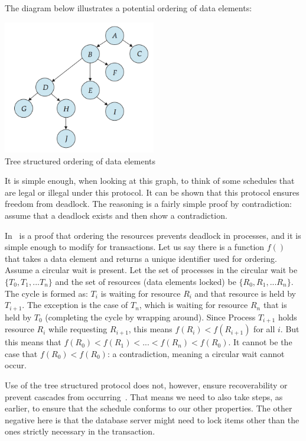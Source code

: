 The diagram below illustrates a potential ordering of data elements:

\begin{center}
\includegraphics[width=0.5\textwidth]{images/tree-lock}\\
Tree structured ordering of data elements~\cite{dsc}
\end{center}

It is simple enough, when looking at this graph, to think of some schedules that are legal or illegal under this protocol. It can be shown that this protocol ensures freedom from deadlock. The reasoning is a fairly simple proof by contradiction: assume that a deadlock exists and then show a contradiction.

In~\cite{osc} is a proof that ordering the resources prevents deadlock in processes, and it is simple enough to modify for transactions. Let us say there is a function $f()$ that takes a data element and returns a unique identifier used for ordering. Assume a circular wait is present. Let the set of processes in the circular wait be $\{T_{0}, T_{1}, ... T_{n}\}$ and the set of resources (data elements locked) be $\{R_{0}, R_{1}, ... R_{n}\}$. The cycle is formed as: $T_{i}$ is waiting for resource $R_{i}$ and that resource is held by $T_{i+1}$. The exception is the case of $T_{n}$, which is waiting for resource $R_{n}$ that is held by $T_{0}$ (completing the cycle by wrapping around). Since Process $T_{i+1}$ holds resource $R_{i}$ while requesting $R_{i+1}$, this means $f(R_{i}) < f(R_{i+1})$ for all $i$. But this means that $f(R_{0}) < f(R_{1}) < ... < f(R_{n}) < f(R_{0})$. It cannot be the case that $f(R_{0}) < f(R_{0})$: a contradiction, meaning a circular wait cannot occur.

Use of the tree structured protocol does not, however, ensure recoverability or prevent cascades from occurring~\cite{dsc}. That means we need to also take steps, as earlier, to ensure that the schedule conforms to our other properties. The other negative here is that the database server might need to lock items other than the ones strictly necessary in the transaction.

